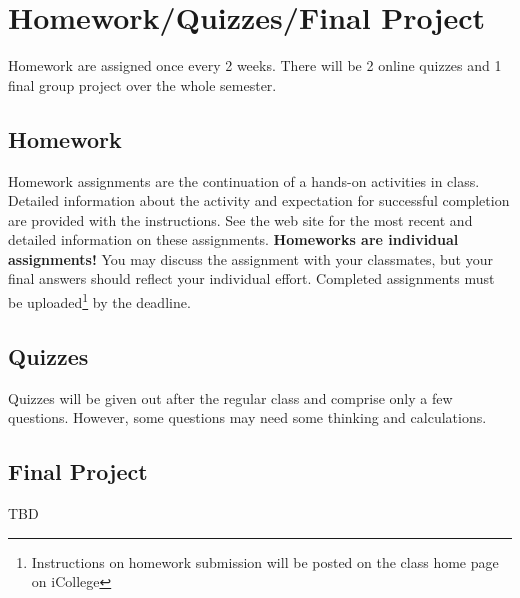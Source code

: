 \documentclass[a4paper, 12pt]{article}
\begin{document}
\section{Homework/Quizzes/Final Project}
Homework are assigned once every 2 weeks. There will be 2 online quizzes and 1 final group project over the whole semester.

\subsection{Homework}
Homework assignments are the continuation of a hands-on activities in class. Detailed information about the activity and expectation for successful completion are provided with the instructions. See the web site for the most recent and detailed information on these assignments. \textbf{Homeworks are individual assignments!} You may discuss the assignment with your classmates, but your ﬁnal answers should reﬂect your individual eﬀort. Completed assignments must be uploaded\footnote{Instructions on homework submission will be posted on the class home page on iCollege} by the deadline.

\subsection{Quizzes}
Quizzes will be given out after the regular class and comprise only a few questions. However, some questions may need some thinking and calculations.

\subsection{Final Project}
TBD
\end{document}
